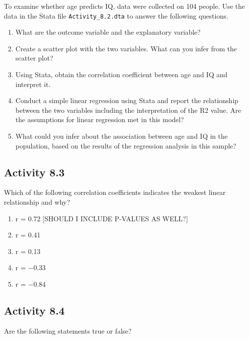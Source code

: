 \documentclass[
]{memoir}
\providecommand{\tightlist}{%
  \setlength{\itemsep}{0pt}\setlength{\parskip}{0pt}}
\begin{document}
To examine whether age predicts IQ, data were collected on 104 people. Use the data in the Stata file \texttt{Activity\_8.2.dta} to answer the following questions.

\begin{enumerate}
\def\labelenumi{\alph{enumi})}
\tightlist
\item
  What are the outcome variable and the explanatory variable?
\item
  Create a scatter plot with the two variables. What can you infer from the scatter plot?
\item
  Using Stata, obtain the correlation coefficient between age and IQ and interpret it.
\item
  Conduct a simple linear regression using Stata and report the relationship between the two variables including the interpretation of the R2 value. Are the assumptions for linear regression met in this model?
\item
  What could you infer about the association between age and IQ in the population, based on the results of the regression analysis in this sample?
\end{enumerate}

\hypertarget{activity-8.3}{%
\subsection*{Activity 8.3}\label{activity-8.3}}

Which of the following correlation coefficients indicates the weakest linear relationship and why?

\begin{enumerate}
\def\labelenumi{\alph{enumi})}
\tightlist
\item
  r = 0.72 {[}SHOULD I INCLUDE P-VALUES AS WELL?{]}
\item
  r = 0.41
\item
  r = 0.13
\item
  r = −0.33
\item
  r = −0.84
\end{enumerate}

\hypertarget{activity-8.4}{%
\subsection*{Activity 8.4}\label{activity-8.4}}

Are the following statements true or false?
\end{document}
